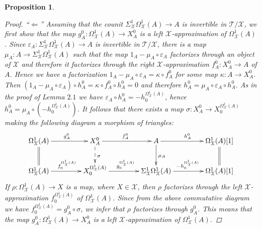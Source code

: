 \documentclass[oneside, a4paper,reqno]{amsart}
\numberwithin{equation}{section}
\newtheorem{prop}[thm]{Proposition}
\theoremstyle{definition}
\begin{document}
\begin{prop}
\begin{proof}
``$\Longleftarrow$'' Assuming that the counit  $\Sigma^{1}_{\mathcal X}\Omega^{1}_{\mathcal X}(A) {\longrightarrow} A$ is invertible in ${\mathcal T}/{\mathcal X}$, we first show that the map $g^{0}_{A} \colon \Omega^{1}_{\mathcal X}(A) {\longrightarrow} X^{0}_{A}$ is a left ${\mathcal X}$-approximation of $\Omega^{1}_{\mathcal X}(A)$. Since $\varepsilon_{A} \colon \Sigma^{1}_{\mathcal X}\Omega^{1}_{\mathcal X}(A) {\longrightarrow} A$ is invertible in ${\mathcal T}/{\mathcal X}$, there is a map $\mu_{A} \colon A {\longrightarrow} \Sigma^{1}_{\mathcal X}\Omega^{1}_{\mathcal X}(A)$ such that the map $1_{A} - \mu_{A} \circ \varepsilon_{A}$ factorizes through an object of ${\mathcal X}$ and therefore it factorizes through the right ${\mathcal X}$-approximation $f^{0}_{A} \colon X^{0}_{A} {\longrightarrow} A$ of $A$. Hence we have a factorization $1_{A} - \mu_{A} \circ \varepsilon_{A} = \kappa \circ f^{0}_{A}$ for some map $\kappa \colon A {\longrightarrow} X^{0}_{A}$. Then $(1_{A} - \mu_{A} \circ \varepsilon_{A})\circ h^{0}_{A} = \kappa \circ f^{0}_{A} \circ h^{0}_{A} = 0$ and therefore $h^{0}_{A} = \mu_{A} \circ \varepsilon_{A} \circ h^{0}_{A}$. As in the proof of Lemma $2.1$ we have $\varepsilon_{A} \circ h^{0}_{A} = - h^{\Omega^{1}_{\mathcal X}(A)}_{0}$, hence $h^{0}_{A} = \mu_{A} \circ (- h^{\Omega^{1}_{\mathcal X}(A)}_{0})$.  It follows that there exists a map $\sigma \colon X^{0}_{A} {\longrightarrow} X^{\Omega^{1}_{\mathcal X}(A)}_{0}$ making the following diagram a morphism of triangles:
\[
\xymatrix@C=1.5cm{
  \Omega^{1}_{\mathcal X}(A) \ar[r]^{g^{0}_{A}} \ar@{=}[d] & X_A^0 \ar@{-->}[d]^{\sigma} \ar[r]^{f^{0}_{A}} & A \ar[d]^{\mu_{A}} \ar[r]^{h^{0}_{A}} & \Omega^{1}_{\mathcal X}(A)[1] \ar@{=}[d]  \\
  \Omega^{1}_{\mathcal X}(A) \ar[r]^{f^{\Omega^{1}_{\mathcal X}(A)}_{0}} & X^{\Omega^{1}_{\mathcal X}(A)}_{0} \ar[r]^{g^{\Omega^{1}_{\mathcal X}(A)}_{0}} & \Sigma^{1}_{\mathcal X}\Omega^{1}_{\mathcal X}(A) \ar[r]^{-h^{\Omega^{1}_{\mathcal X}(A)}_{0}} & \Omega^{1}_{\mathcal X}(A)[1]   }
\]  
If $\rho \colon \Omega^{1}_{\mathcal X}(A) {\longrightarrow} X$ is a map, where $X \in {\mathcal X}$, then $\rho$ factorizes through the left ${\mathcal X}$-approximation $f^{\Omega^{1}_{\mathcal X}(A)}_{0}$ of $\Omega^{1}_{\mathcal X}(A)$. Since from the above commutative diagram we have $f^{\Omega^{1}_{\mathcal X}(A)}_{0} = g^{0}_{A} \circ \sigma$, we infer that $\rho$ factorizes through $g^{0}_{A}$. This means that  the map $g^{0}_{A} \colon \Omega^{1}_{\mathcal X}(A) {\longrightarrow} X^{0}_{A}$ is a left ${\mathcal X}$-approximation of $\Omega^{1}_{\mathcal X}(A)$. 


\end{proof}
\end{prop}
\end{document}

